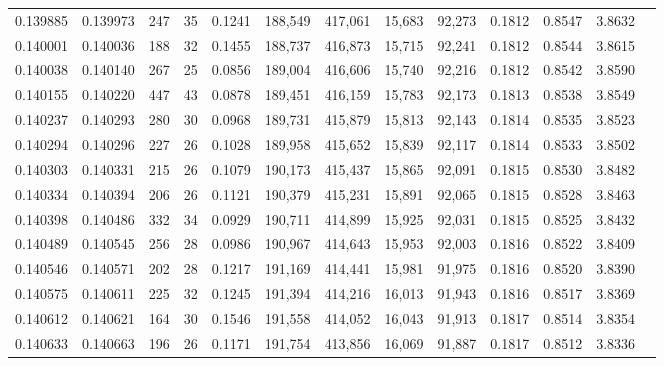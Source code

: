 \begin{tabular}{rrrrrrrrrrrrr}
0.139885 & 0.139973 &   247 &  35 &                                     0.1241 & 188,549 & 417,061 &  15,683 &  92,273 & 0.1812 & 0.8547 & 3.8632 \\
0.140001 & 0.140036 &   188 &  32 &                                     0.1455 & 188,737 & 416,873 &  15,715 &  92,241 & 0.1812 & 0.8544 & 3.8615 \\
0.140038 & 0.140140 &   267 &  25 &                                     0.0856 & 189,004 & 416,606 &  15,740 &  92,216 & 0.1812 & 0.8542 & 3.8590 \\
0.140155 & 0.140220 &   447 &  43 &                                     0.0878 & 189,451 & 416,159 &  15,783 &  92,173 & 0.1813 & 0.8538 & 3.8549 \\
0.140237 & 0.140293 &   280 &  30 &                                     0.0968 & 189,731 & 415,879 &  15,813 &  92,143 & 0.1814 & 0.8535 & 3.8523 \\
0.140294 & 0.140296 &   227 &  26 &                                     0.1028 & 189,958 & 415,652 &  15,839 &  92,117 & 0.1814 & 0.8533 & 3.8502 \\
0.140303 & 0.140331 &   215 &  26 &                                     0.1079 & 190,173 & 415,437 &  15,865 &  92,091 & 0.1815 & 0.8530 & 3.8482 \\
0.140334 & 0.140394 &   206 &  26 &                                     0.1121 & 190,379 & 415,231 &  15,891 &  92,065 & 0.1815 & 0.8528 & 3.8463 \\
0.140398 & 0.140486 &   332 &  34 &                                     0.0929 & 190,711 & 414,899 &  15,925 &  92,031 & 0.1815 & 0.8525 & 3.8432 \\
0.140489 & 0.140545 &   256 &  28 &                                     0.0986 & 190,967 & 414,643 &  15,953 &  92,003 & 0.1816 & 0.8522 & 3.8409 \\
0.140546 & 0.140571 &   202 &  28 &                                     0.1217 & 191,169 & 414,441 &  15,981 &  91,975 & 0.1816 & 0.8520 & 3.8390 \\
0.140575 & 0.140611 &   225 &  32 &                                     0.1245 & 191,394 & 414,216 &  16,013 &  91,943 & 0.1816 & 0.8517 & 3.8369 \\
0.140612 & 0.140621 &   164 &  30 &                                     0.1546 & 191,558 & 414,052 &  16,043 &  91,913 & 0.1817 & 0.8514 & 3.8354 \\
0.140633 & 0.140663 &   196 &  26 &                                     0.1171 & 191,754 & 413,856 &  16,069 &  91,887 & 0.1817 & 0.8512 & 3.8336 \\

\end{tabular}
